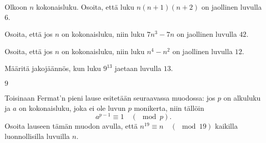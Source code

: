 \begin{tehtavasivu}
\begin{tehtava}
    \begin{alakohdat}
    \end{alakohdat}
    
    \begin{vastaus}
    
        \begin{alakohdat}
        \end{alakohdat}
    \end{vastaus}
    
\end{tehtava}

\begin{tehtava}
    Olkoon $n$ kokonaisluku. Osoita, että luku $n(n+1)(n+2)$ on jaollinen luvulla $6$.
\end{tehtava}

\begin{tehtava}
    Osoita, että jos $n$ on kokonaisluku, niin luku $7n^3 - 7n$ on jaollinen luvulla $42$.
\end{tehtava}

\begin{tehtava}
    Osoita, että jos $n$ on kokonaisluku, niin luku $n^4 - n^2$ on jaollinen luvulla $12$.
\end{tehtava}

\begin{tehtava}
    Määritä jakojäännös, kun luku $9^{13}$ jaetaan luvulla $13$.
    
    \begin{vastaus}
        $9$
    \end{vastaus}
    
\end{tehtava}

\begin{tehtava}
    Toisinaan Fermat'n pieni lause esitetään seuraavassa
    muodossa:
    jos $p$ on alkuluku ja $a$ on kokonaisluku, joka ei ole
    luvun $p$ monikerta, niin tällöin
    \[
    a^{p-1}\equiv 1\quad (\mod p).
    \]
    Osoita lauseen tämän muodon avulla, että $n^{19}\equiv n \quad
    (\mod 19)$ kaikilla luonnollisilla luvuilla $n$.
\end{tehtava}


\end{tehtavasivu}
